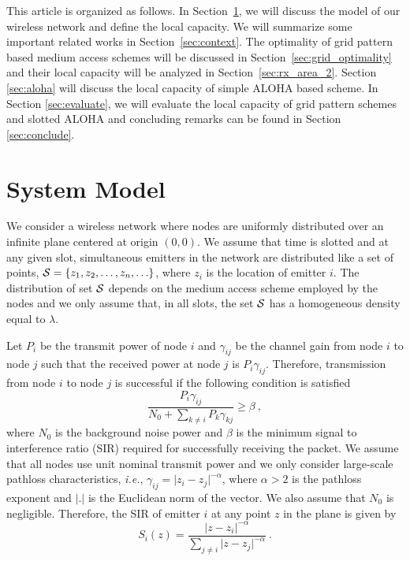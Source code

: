 \documentclass[12pt,english]{article}
\begin{document}
This article is organized as follows. In Section~\ref{sec:model}, we will discuss the model of our wireless network and define the local capacity. We will summarize some important related works in Section~\ref{sec:context}. The optimality of grid pattern based medium access schemes will be discussed in Section~\ref{sec:grid_optimality} and their local capacity will be analyzed in Section~\ref{sec:rx_area_2}. Section~ \ref{sec:aloha} will discuss the local capacity of simple ALOHA based scheme. In Section \ref{sec:evaluate}, we will evaluate the local capacity of grid pattern schemes and slotted ALOHA and concluding remarks can be found in Section \ref{sec:conclude}.

\section{System Model}
\label{sec:model}

We consider a wireless network where nodes are uniformly distributed over an infinite plane centered at origin $(0,0)$. We assume that time is slotted and at any given slot, simultaneous emitters in the network are distributed like a set of points, \mbox{${\cal S}=\{z_1,z_2,\ldots,z_n,\ldots\}$}, where $z_i$ is the location of emitter $i$. The distribution of set ${\cal S}$ depends on the medium access scheme employed by the nodes and we only assume that, in all slots, the set ${\cal S}$ has a homogeneous density equal to $\lambda$. 

Let $P_i$ be the transmit power of node $i$ and $\gamma_{ij}$ be the channel gain from node $i$ to node $j$ such that the received power at node $j$ is $P_i\gamma_{ij}$. Therefore, transmission from node $i$ to node $j$ is successful if the following condition is satisfied
$$
\frac{P_i\gamma_{ij}}{N_0+\sum_{k\neq i}P_k\gamma_{kj}}\geq \beta~,
$$
where $N_0$ is the background noise power and $\beta$ is the minimum signal to interference ratio (SIR) required for successfully receiving the packet. We assume that all nodes use unit nominal transmit power and we only consider large-scale pathloss characteristics, {\it i.e.}, \mbox{$\gamma_{ij}=\vert z_i-z_j\vert^{-\alpha}$}, where \mbox{$\alpha>2$} is the pathloss exponent and $\vert .\vert$ is the Euclidean norm of the vector. We also assume that $N_0$ is negligible. Therefore, the SIR of emitter $i$ at any point $z$ in the plane is given by
\begin{equation}
S_i(z)=\frac{\vert  z-z_i\vert^{-\alpha}}{\sum_{j\neq i}\vert  z-z_j\vert^{-\alpha}}~.
\label{eq:sinr}
\end{equation} 
\end{document}
